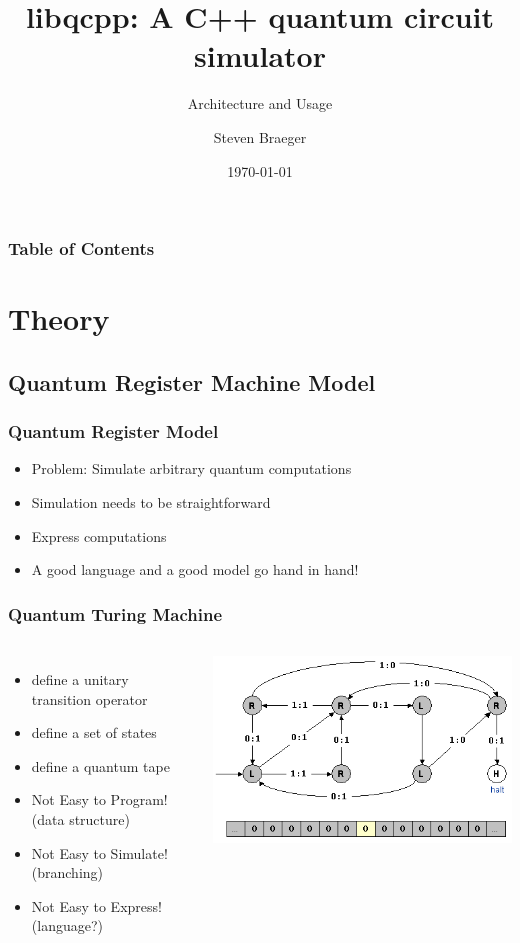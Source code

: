 \documentclass{beamer}
\title
{libqcpp: A C++ quantum circuit simulator}
\subtitle{Architecture and Usage}
\author
{Steven Braeger}
\date{\today}
\begin{document}
\frame{\titlepage} 


\begin{frame}
\frametitle{Table of Contents}
\tableofcontents
\end{frame}

\section{Theory}
\subsection{Quantum Register Machine Model}

\begin{frame}
  \frametitle{Quantum Register Model}
   \begin{itemize}
    \item Problem:  Simulate arbitrary quantum computations
    \item Simulation needs to be straightforward
    \item Express computations
    \item A good language and a good model go hand in hand!
   \end{itemize}
\end{frame}

\begin{frame}
   \frametitle{Quantum Turing Machine}

\begin{columns}[c]
\column{2.5in}
   \begin{itemize}
    \item define a unitary transition operator
    \item define a set of states
    \item define a quantum tape
    \item Not Easy to Program! (data structure)
    \item Not Easy to Simulate!(branching)
    \item Not Easy to Express! (language?)
   \end{itemize}
\column{2in}
\includegraphics[width=\textwidth]{./beaverTM.png}
\end{columns}

\end{frame}
\end{document}
